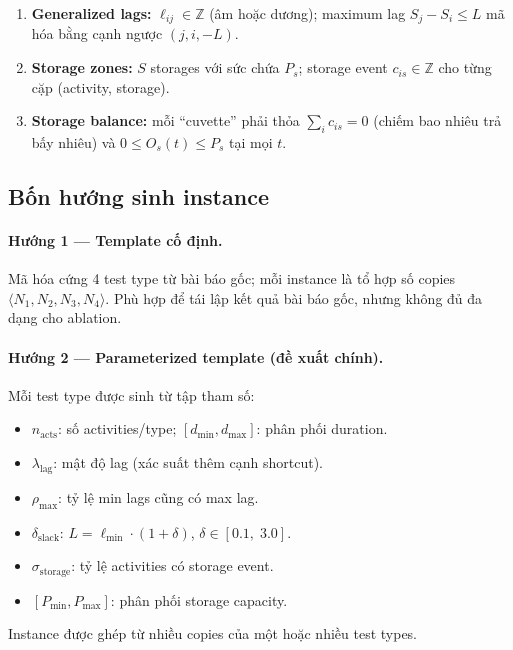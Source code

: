 \documentclass[11pt,a4paper]{article}
\theoremstyle{remark}
\begin{document}
\begin{enumerate}
  \item \textbf{Generalized lags:} $\ell_{ij} \in \mathbb{Z}$ (âm hoặc dương);
    maximum lag $S_j - S_i \le L$ mã hóa bằng cạnh ngược
    $(j, i, -L)$.
  \item \textbf{Storage zones:} $S$ storages với sức chứa $P_s$;
    storage event $c_{is} \in \mathbb{Z}$ cho từng cặp (activity, storage).
  \item \textbf{Storage balance:} mỗi ``cuvette'' phải thỏa
    $\sum_i c_{is} = 0$ (chiếm bao nhiêu trả bấy nhiêu) và
    $0 \le O_s(t) \le P_s$ tại mọi $t$.
\end{enumerate}

\subsection{Bốn hướng sinh instance}

\paragraph{Hướng 1 — Template cố định.}
Mã hóa cứng 4 test type từ bài báo gốc; mỗi instance là tổ hợp số copies
$\langle N_1, N_2, N_3, N_4 \rangle$. Phù hợp để tái lập kết quả bài báo
gốc, nhưng không đủ đa dạng cho ablation.

\paragraph{Hướng 2 — Parameterized template (đề xuất chính).}
Mỗi test type được sinh từ tập tham số:
\begin{itemize}[noitemsep]
  \item $n_\mathrm{acts}$: số activities/type; $[d_{\min}, d_{\max}]$: phân phối duration.
  \item $\lambda_\mathrm{lag}$: mật độ lag (xác suất thêm cạnh shortcut).
  \item $\rho_\mathrm{max}$: tỷ lệ min lags cũng có max lag.
  \item $\delta_\mathrm{slack}$: $L = \ell_{\min} \cdot (1 + \delta)$,
    $\delta \in [0.1,\; 3.0]$.
  \item $\sigma_\mathrm{storage}$: tỷ lệ activities có storage event.
  \item $[P_{\min}, P_{\max}]$: phân phối storage capacity.
\end{itemize}
Instance được ghép từ nhiều copies của một hoặc nhiều test types.
\end{document}
